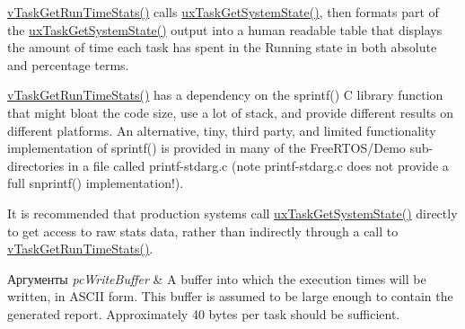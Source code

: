 \mbox{\hyperlink{task_8h_a52da9b427041a48dc9f6802e10f151d4}{v\+Task\+Get\+Run\+Time\+Stats()}} calls \mbox{\hyperlink{task_8h_aa4603f3de3d809e9beb18d10fbac005d}{ux\+Task\+Get\+System\+State()}}, then formats part of the \mbox{\hyperlink{task_8h_aa4603f3de3d809e9beb18d10fbac005d}{ux\+Task\+Get\+System\+State()}} output into a human readable table that displays the amount of time each task has spent in the Running state in both absolute and percentage terms.

\mbox{\hyperlink{task_8h_a52da9b427041a48dc9f6802e10f151d4}{v\+Task\+Get\+Run\+Time\+Stats()}} has a dependency on the sprintf() C library function that might bloat the code size, use a lot of stack, and provide different results on different platforms. An alternative, tiny, third party, and limited functionality implementation of sprintf() is provided in many of the Free\+R\+T\+O\+S/\+Demo sub-\/directories in a file called printf-\/stdarg.\+c (note printf-\/stdarg.\+c does not provide a full snprintf() implementation!).

It is recommended that production systems call \mbox{\hyperlink{task_8h_aa4603f3de3d809e9beb18d10fbac005d}{ux\+Task\+Get\+System\+State()}} directly to get access to raw stats data, rather than indirectly through a call to \mbox{\hyperlink{task_8h_a52da9b427041a48dc9f6802e10f151d4}{v\+Task\+Get\+Run\+Time\+Stats()}}.


\begin{DoxyParams}{Аргументы}
{\em pc\+Write\+Buffer} & A buffer into which the execution times will be written, in A\+S\+C\+II form. This buffer is assumed to be large enough to contain the generated report. Approximately 40 bytes per task should be sufficient. \\
\hline
\end{DoxyParams}

